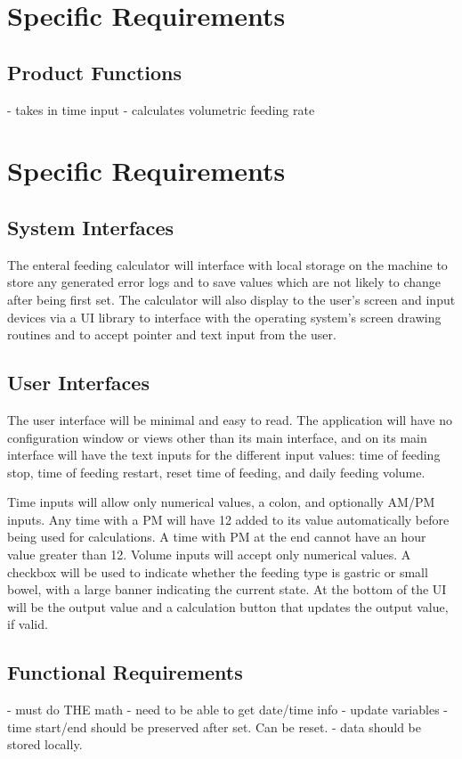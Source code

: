\documentclass[10pt,draftclsnofoot,onecolumn]{IEEEtran}
\begin{document}
\section{Specific Requirements}

\subsection{Product Functions}
- takes in time input
- calculates volumetric feeding rate 

\section{Specific Requirements}
\subsection{System Interfaces}
The enteral feeding calculator will interface with local storage on the machine to store any generated 
error logs and to save values which are not likely to change after being first set. The calculator will
also display to the user's screen and input devices via a UI library to interface with the operating system's screen drawing
routines and to accept pointer and text input from the user.

\subsection{User Interfaces}
The user interface will be minimal and easy to read. The application will have no configuration window
or views other than its main interface, and on its main interface will have the text inputs for the different
input values: time of feeding stop, time of feeding restart, reset time of feeding, and daily feeding volume.

Time inputs will allow only numerical values, a colon, and optionally AM/PM inputs. Any time with a PM will
have 12 added to its value automatically before being used for calculations. A time with PM at the end cannot have an hour value greater than 12.
Volume inputs will accept only numerical values. A checkbox will be used to indicate whether the feeding type is gastric or
small bowel, with a large banner indicating the current state. At the bottom of the UI will be the output value and a calculation
button that updates the output value, if valid.

\subsection{Functional Requirements}
- must do THE math
- need to be able to get date/time info
- update variables
- time start/end should be preserved after set. Can be reset.
- data should be stored locally.
\end{document}
